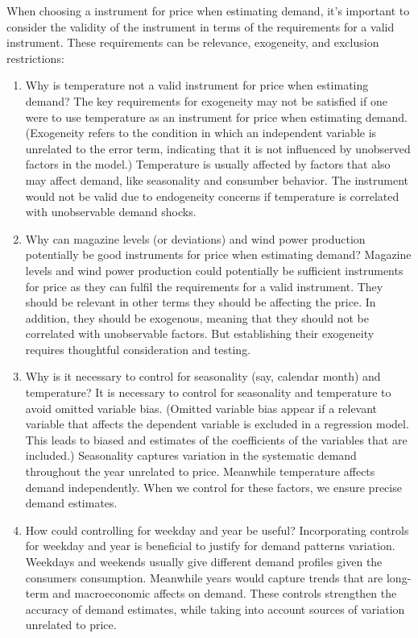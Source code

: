 \documentclass[
  letterpaper,
  DIV=11,
  numbers=noendperiod]{scrartcl}
\begin{document}
When choosing a instrument for price when estimating demand, it's
important to consider the validity of the instrument in terms of the
requirements for a valid instrument. These requirements can be
relevance, exogeneity, and exclusion restrictions:

\begin{enumerate}
\def\labelenumi{\arabic{enumi}.}
\item
  Why is temperature not a valid instrument for price when estimating
  demand? The key requirements for exogeneity may not be satisfied if
  one were to use temperature as an instrument for price when estimating
  demand. (Exogeneity refers to the condition in which an independent
  variable is unrelated to the error term, indicating that it is not
  influenced by unobserved factors in the model.) Temperature is usually
  affected by factors that also may affect demand, like seasonality and
  consumber behavior. The instrument would not be valid due to
  endogeneity concerns if temperature is correlated with unobservable
  demand shocks.
\item
  Why can magazine levels (or deviations) and wind power production
  potentially be good instruments for price when estimating demand?
  Magazine levels and wind power production could potentially be
  sufficient instruments for price as they can fulfil the requirements
  for a valid instrument. They should be relevant in other terms they
  should be affecting the price. In addition, they should be exogenous,
  meaning that they should not be correlated with unobservable factors.
  But establishing their exogeneity requires thoughtful consideration
  and testing.
\item
  Why is it necessary to control for seasonality (say, calendar month)
  and temperature? It is necessary to control for seasonality and
  temperature to avoid omitted variable bias. (Omitted variable bias
  appear if a relevant variable that affects the dependent variable is
  excluded in a regression model. This leads to biased and estimates of
  the coefficients of the variables that are included.) Seasonality
  captures variation in the systematic demand throughout the year
  unrelated to price. Meanwhile temperature affects demand
  independently. When we control for these factors, we ensure precise
  demand estimates.
\item
  How could controlling for weekday and year be useful? Incorporating
  controls for weekday and year is beneficial to justify for demand
  patterns variation. Weekdays and weekends usually give different
  demand profiles given the consumers consumption. Meanwhile years would
  capture trends that are long-term and macroeconomic affects on demand.
  These controls strengthen the accuracy of demand estimates, while
  taking into account sources of variation unrelated to price.
\end{enumerate}
\end{document}

